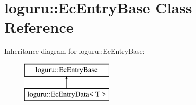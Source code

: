 \hypertarget{classloguru_1_1_ec_entry_base}{}\section{loguru\+:\+:Ec\+Entry\+Base Class Reference}
\label{classloguru_1_1_ec_entry_base}
Inheritance diagram for loguru\+:\+:Ec\+Entry\+Base\+:\begin{figure}[H]
\begin{center}
\leavevmode
\includegraphics[height=2.000000cm]{d7/d68/classloguru_1_1_ec_entry_base}
\end{center}
\end{figure}
